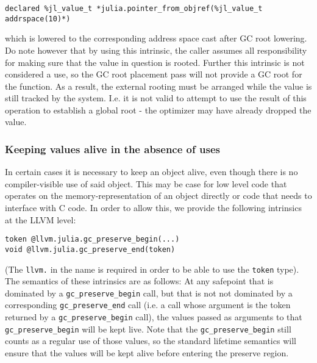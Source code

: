 \begin{lstlisting}
declared %jl_value_t *julia.pointer_from_objref(%jl_value_t addrspace(10)*)
\end{lstlisting}



which is lowered to the corresponding address space cast after GC root lowering. Do note however that by using this intrinsic, the caller assumes all responsibility for making sure that the value in question is rooted. Further this intrinsic is not considered a use, so the GC root placement pass will not provide a GC root for the function. As a result, the external rooting must be arranged while the value is still tracked by the system. I.e. it is not valid to attempt to use the result of this operation to establish a global root - the optimizer may have already dropped the value.



\hypertarget{13949345143972752854}{}


\subsubsection{Keeping values alive in the absence of uses}



In certain cases it is necessary to keep an object alive, even though there is no compiler-visible use of said object. This may be case for low level code that operates on the memory-representation of an object directly or code that needs to interface with C code. In order to allow this, we provide the following intrinsics at the LLVM level:




\begin{lstlisting}
token @llvm.julia.gc_preserve_begin(...)
void @llvm.julia.gc_preserve_end(token)
\end{lstlisting}



(The \texttt{llvm.} in the name is required in order to be able to use the \texttt{token} type). The semantics of these intrinsics are as follows: At any safepoint that is dominated by a \texttt{gc\_preserve\_begin} call, but that is not not dominated by a corresponding \texttt{gc\_preserve\_end} call (i.e. a call whose argument is the token returned by a \texttt{gc\_preserve\_begin} call), the values passed as arguments to that \texttt{gc\_preserve\_begin} will be kept live. Note that the \texttt{gc\_preserve\_begin} still counts as a regular use of those values, so the standard lifetime semantics will ensure that the values will be kept alive before entering the preserve region.



